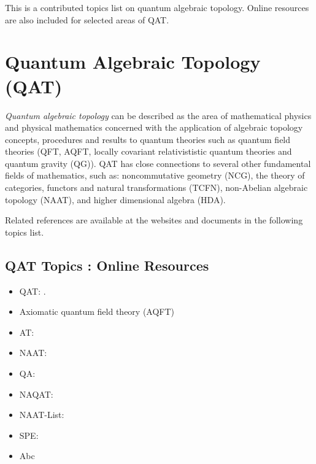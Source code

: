 \documentclass[12pt]{article}
\theoremstyle{plain}
\theoremstyle{definition}
\numberwithin{equation}{section}
\begin{document}
This is a contributed topics list on quantum algebraic topology.
Online resources are also included for selected areas of QAT.

\section{Quantum Algebraic Topology (QAT)}

\emph{Quantum algebraic topology} can be described as the area of mathematical physics and physical mathematics concerned with the application of algebraic topology concepts, procedures and results to quantum theories such as quantum field theories (QFT, AQFT, locally covariant relativististic quantum theories and quantum gravity (QG)). QAT has close connections to several other fundamental fields of mathematics, such as: noncommutative geometry (NCG), the theory of categories, functors and natural transformations (TCFN), non-Abelian algebraic topology (NAAT), and higher dimensional algebra (HDA). 
 
Related references are available at the websites and documents in the following topics list.  

\subsection{QAT Topics : Online Resources}

\begin{itemize}
\item QAT: 
.
\item Axiomatic quantum field theory (AQFT)
\item AT: 
\item NAAT: 
\item QA:  
\item NAQAT:  
\item NAAT-List:
\item SPE: 
\item Abc
\end{itemize}
\end{document}
